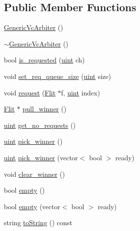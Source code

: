 \subsection*{Public Member Functions}
\begin{CompactItemize}
\item 
\hyperlink{classGenericVcArbiter_8ad20b81e2a38303b310d15e1dcc9947}{GenericVcArbiter} ()
\item 
\hyperlink{classGenericVcArbiter_da76ff9f227949f97ecd02d1bf89b5c8}{$\sim$GenericVcArbiter} ()
\item 
bool \hyperlink{classGenericVcArbiter_bea0f63a51a1bfbfe7bd3a3ee0b95b48}{is\_\-requested} (\hyperlink{outputBuffer_8h_91ad9478d81a7aaf2593e8d9c3d06a14}{uint} ch)
\item 
void \hyperlink{classGenericVcArbiter_9424efde9588993e6b7315bd8e536ee9}{set\_\-req\_\-queue\_\-size} (\hyperlink{outputBuffer_8h_91ad9478d81a7aaf2593e8d9c3d06a14}{uint} size)
\item 
void \hyperlink{classGenericVcArbiter_c118c1a5cc6a9d105cd6ac5c54c7fe77}{request} (\hyperlink{classFlit}{Flit} $\ast$f, \hyperlink{outputBuffer_8h_91ad9478d81a7aaf2593e8d9c3d06a14}{uint} index)
\item 
\hyperlink{classFlit}{Flit} $\ast$ \hyperlink{classGenericVcArbiter_af615d6c6a206070c87e2ecdf82a717d}{pull\_\-winner} ()
\item 
\hyperlink{outputBuffer_8h_91ad9478d81a7aaf2593e8d9c3d06a14}{uint} \hyperlink{classGenericVcArbiter_0648f3756140fa6acc1e9345015b3461}{get\_\-no\_\-requests} ()
\item 
\hyperlink{outputBuffer_8h_91ad9478d81a7aaf2593e8d9c3d06a14}{uint} \hyperlink{classGenericVcArbiter_55ce40bdf8fa7c2ea448ee5aa5c50921}{pick\_\-winner} ()
\item 
\hyperlink{outputBuffer_8h_91ad9478d81a7aaf2593e8d9c3d06a14}{uint} \hyperlink{classGenericVcArbiter_d5d1e1d3532c52f4e3cdb92ab2a235ec}{pick\_\-winner} (vector$<$ bool $>$ ready)
\item 
void \hyperlink{classGenericVcArbiter_4cd15ea7b1b8ff50cbd9148826880fdf}{clear\_\-winner} ()
\item 
bool \hyperlink{classGenericVcArbiter_c03a3978b5564acfd561a097384570d5}{empty} ()
\item 
bool \hyperlink{classGenericVcArbiter_89fe4818dbc079a5305db9cfe23fd5a3}{empty} (vector$<$ bool $>$ ready)
\item 
string \hyperlink{classGenericVcArbiter_b2b98c13d7e7c13e703845591f241e70}{toString} () const 
\item 

\end{CompactItemize}
